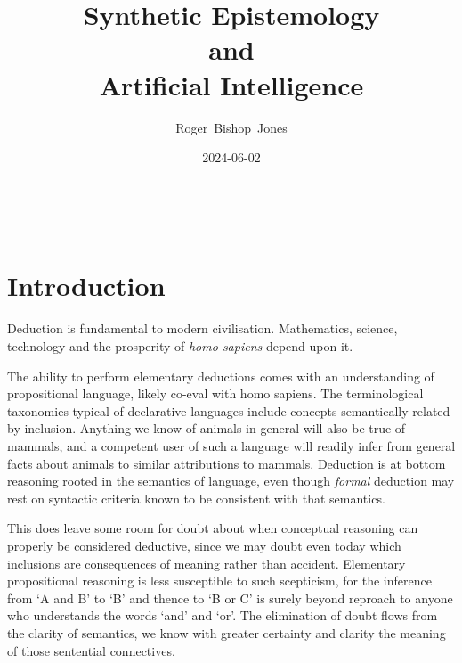 \documentclass[10pt,titlepage]{book}
\title{\bf\LARGE Synthetic  Epistemology\\ and\\ Artificial Intelligence}
\author{Roger~Bishop~Jones}
\date{\small 2024-06-02}
\newcommand{\ignore}[1]{}
\begin{document}

%
                               
\begin{titlepage}
\maketitle





\end{titlepage}

\ \

\ignore{
\begin{centering}
{}
\end{centering}
}%

\setcounter{tocdepth}{2}
{\parskip-0pt\tableofcontents}



\chapter{Introduction}

Deduction is fundamental to modern civilisation.
Mathematics, science, technology and the prosperity of \emph{homo sapiens} depend upon it.

The ability to perform elementary deductions comes with an understanding of propositional language, likely co-eval with homo sapiens.
The terminological taxonomies typical of declarative languages include concepts semantically related by inclusion.
Anything we know of animals in general will also be true of mammals, and a competent user of such a language will readily infer from general facts about animals to similar attributions to mammals.
Deduction is at bottom reasoning rooted in the semantics of language, even though \emph{formal} deduction may rest on syntactic criteria known to be consistent with that semantics.

This does leave some room for doubt about when conceptual reasoning can properly be considered deductive, since we may doubt even today which inclusions are consequences of meaning rather than accident.
Elementary propositional reasoning is less susceptible to such scepticism, for the inference from `A and B' to `B' and thence to `B or C' is surely beyond reproach to anyone who understands the words `and' and `or'.
The elimination of doubt flows from the clarity of semantics, we know with greater certainty and clarity the meaning of those sentential connectives.
\end{document}
